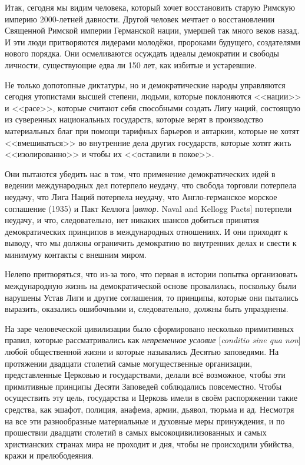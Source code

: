 Итак, сегодня мы видим человека, который хочет восстановить старую Римскую империю 2000-летней давности. Другой человек мечтает о восстановлении Священной Римской империи Германской нации, умершей так много веков назад. И эти люди притворяются лидерами молодёжи, пророками будущего, создателями нового порядка. Они осмеливаются осуждать идеалы демократии и свободы личности, существующие едва ли 150 лет, как избитые и устаревшие.

Не только допотопные диктатуры, но и демократические народы управляются сегодня утопистами высшей степени, людьми, которые поклоняются <<нации>> и <<расе>>, которые считают себя способными создать Лигу наций, состоящую из суверенных национальных государств, которые верят в производство материальных благ при помощи тарифных барьеров и автаркии, которые не хотят <<вмешиваться>> во внутренние дела других государств, которые хотят жить <<изолированно>> и чтобы их <<оставили в покое>>.

Они пытаются убедить нас в том, что применение демократических идей в ведении международных дел потерпело неудачу, что свобода торговли потерпела неудачу, что Лига Наций потерпела неудачу, что Англо-германское морское соглашение (1935) и Пакт Келлога [\textit{автор.} Naval and Kellogg Pacts] потерпели неудачу, и что, следовательно, нет никаких шансов добиться принятия демократических принципов в международных отношениях. И они приходят к выводу, что мы должны ограничить демократию во внутренних делах и свести к минимуму контакты с внешним миром.

Нелепо притворяться, что из-за того, что первая в истории попытка организовать международную жизнь на демократической основе провалилась, поскольку были нарушены Устав Лиги и другие соглашения, то принципы, которые они пытались выразить, оказались ошибочными и, следовательно, должны быть упразднены.

На заре человеческой цивилизации было сформировано несколько примитивных правил, которые рассматривались как \textit{непременное условие} [\textit{conditio sine qua non}] любой общественной жизни и которые назывались Десятью заповедями. На протяжении двадцати столетий самые могущественные организации, представленные Церковью и государствами, делали всё возможное, чтобы эти примитивные принципы Десяти Заповедей соблюдались повсеместно. Чтобы осуществить эту цель, государства и Церковь имели в своём распоряжении такие средства, как эшафот, полиция, анафема, армии, дьявол, тюрьма и ад. Несмотря на все эти разнообразные материальные и духовные меры принуждения, и по прошествии двадцати столетий в самых высокоцивилизованных и самых христианских странах мира не проходит и дня, чтобы не происходили убийства, кражи и прелюбодеяния.

